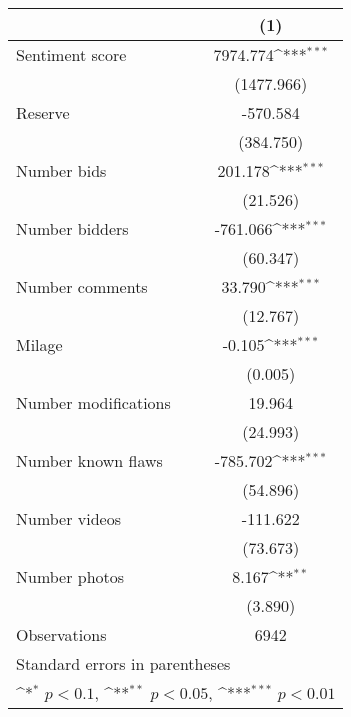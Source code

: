 {
\def\sym#1{\ifmmode^{#1}\else\(^{#1}\)\fi}
\begin{tabular}{l*{1}{c}}
\hline\hline
                    &\multicolumn{1}{c}{(1)}         \\
\hline
Sentiment score     &    7974.774\sym{***}\\
                    &  (1477.966)         \\
[1em]
Reserve             &    -570.584         \\
                    &   (384.750)         \\
[1em]
Number bids         &     201.178\sym{***}\\
                    &    (21.526)         \\
[1em]
Number bidders      &    -761.066\sym{***}\\
                    &    (60.347)         \\
[1em]
Number comments     &      33.790\sym{***}\\
                    &    (12.767)         \\
[1em]
Milage              &      -0.105\sym{***}\\
                    &     (0.005)         \\
[1em]
Number modifications&      19.964         \\
                    &    (24.993)         \\
[1em]
Number known flaws  &    -785.702\sym{***}\\
                    &    (54.896)         \\
[1em]
Number videos       &    -111.622         \\
                    &    (73.673)         \\
[1em]
Number photos       &       8.167\sym{**} \\
                    &     (3.890)         \\
\hline
Observations        &        6942         \\
\hline\hline
\multicolumn{2}{l}{\footnotesize Standard errors in parentheses}\\
\multicolumn{2}{l}{\footnotesize \sym{*} \(p<0.1\), \sym{**} \(p<0.05\), \sym{***} \(p<0.01\)}\\
\end{tabular}
}
